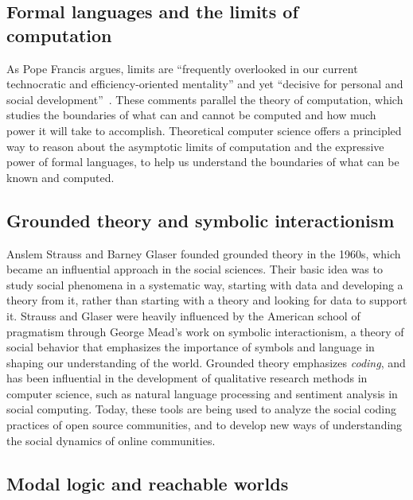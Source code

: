 \documentclass[sigplan,nonacm]{acmart}\settopmatter{printfolios=false,printccs=false,printacmref=false}
\begin{document}
\subsection{Formal languages and the limits of computation}

As Pope Francis argues, limits are ``frequently overlooked in our current technocratic and efficiency-oriented mentality'' and yet ``decisive for personal and social development''~\cite{catholic2024message}. These comments parallel the theory of computation, which studies the boundaries of what can and cannot be computed and how much power it will take to accomplish. Theoretical computer science offers a principled way to reason about the asymptotic limits of computation and the expressive power of formal languages, to help us understand the boundaries of what can be known and computed.


\subsection{Grounded theory and symbolic interactionism}

Anslem Strauss and Barney Glaser founded grounded theory in the 1960s, which became an influential approach in the social sciences. Their basic idea was to study social phenomena in a systematic way, starting with data and developing a theory from it, rather than starting with a theory and looking for data to support it. Strauss and Glaser were heavily influenced by the American school of pragmatism through George Mead's work on symbolic interactionism, a theory of social behavior that emphasizes the importance of symbols and language in shaping our understanding of the world. Grounded theory emphasizes \textit{coding}, and has been influential in the development of qualitative research methods in computer science, such as natural language processing and sentiment analysis in social computing. Today, these tools are being used to analyze the social coding practices of open source communities, and to develop new ways of understanding the social dynamics of online communities.

\subsection{Modal logic and reachable worlds}
\end{document}
